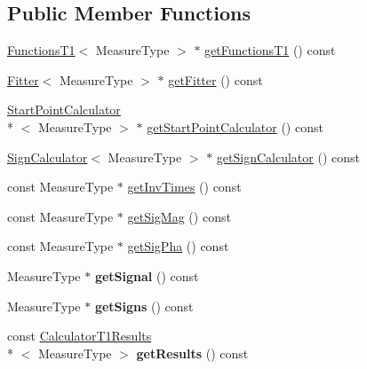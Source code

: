 \subsection*{Public Member Functions}
\begin{DoxyCompactItemize}
\item 
\hyperlink{class_ox_1_1_functions_t1}{Functions\-T1}$<$ Measure\-Type $>$ $\ast$ \hyperlink{class_ox_1_1_calculator_t1_a250feace5a8a546b68aa067557813ffc}{get\-Functions\-T1} () const 
\item 
\hyperlink{class_ox_1_1_fitter}{Fitter}$<$ Measure\-Type $>$ $\ast$ \hyperlink{class_ox_1_1_calculator_t1_a365f66ffbc6cc44a864b8322736da65d}{get\-Fitter} () const 
\item 
\hyperlink{class_ox_1_1_start_point_calculator}{Start\-Point\-Calculator}\\*
$<$ Measure\-Type $>$ $\ast$ \hyperlink{class_ox_1_1_calculator_t1_ae263e2037688cfcff5132987c5c7ecbd}{get\-Start\-Point\-Calculator} () const 
\item 
\hyperlink{class_ox_1_1_sign_calculator}{Sign\-Calculator}$<$ Measure\-Type $>$ $\ast$ \hyperlink{class_ox_1_1_calculator_t1_aeaf40ac1aae1d09362fbde45251aa505}{get\-Sign\-Calculator} () const 
\item 
const Measure\-Type $\ast$ \hyperlink{class_ox_1_1_calculator_t1_aa130ea365656d6d9a9fc9512804c02d4}{get\-Inv\-Times} () const 
\item 
const Measure\-Type $\ast$ \hyperlink{class_ox_1_1_calculator_t1_af3b7c6ed9de0249a2eed3a9982d42d31}{get\-Sig\-Mag} () const 
\item 
const Measure\-Type $\ast$ \hyperlink{class_ox_1_1_calculator_t1_aeaaf92b825eeff78341bf4806ea8e991}{get\-Sig\-Pha} () const 
\item 
\hypertarget{class_ox_1_1_calculator_t1_a141103a127f41c1bf9c2c853bf91c94e}{Measure\-Type $\ast$ {\bfseries get\-Signal} () const }\label{class_ox_1_1_calculator_t1_a141103a127f41c1bf9c2c853bf91c94e}

\item 
\hypertarget{class_ox_1_1_calculator_t1_a78adcda58a09a010cc100bd139f30ac9}{Measure\-Type $\ast$ {\bfseries get\-Signs} () const }\label{class_ox_1_1_calculator_t1_a78adcda58a09a010cc100bd139f30ac9}

\item 
\hypertarget{class_ox_1_1_calculator_t1_a55059e4a211febbd70b1056f0d15cae7}{const \hyperlink{struct_ox_1_1_calculator_t1_results}{Calculator\-T1\-Results}\\*
$<$ Measure\-Type $>$ {\bfseries get\-Results} () const }\label{class_ox_1_1_calculator_t1_a55059e4a211febbd70b1056f0d15cae7}


\end{DoxyCompactItemize}
